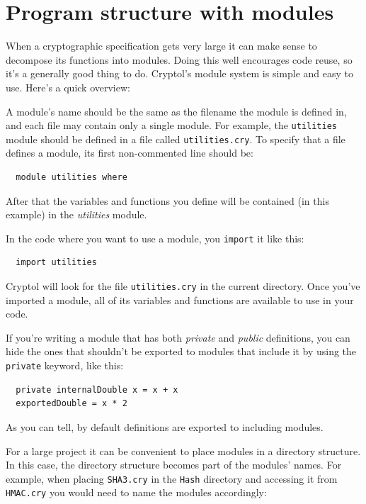 \section{Program structure with modules}

When a cryptographic specification gets very large it can make sense
to decompose its functions into modules.\indModuleSystem\indImport
Doing this well encourages
code reuse, so it's a generally good thing to do. Cryptol's module
system is simple and easy to use. Here's a quick overview:

A module's name should be the same as the filename the module is defined in,
and each file may contain only a single module. For example, the
\verb+utilities+ module should be defined in a file called
\verb+utilities.cry+. To specify that a file defines a module, its first
non-commented line should be:

\begin{verbatim}
  module utilities where
\end{verbatim}

After that the variables and functions you define will be contained
(in this example) in the {\it utilities} module.

In the code where you want to use a module, you \verb+import+ it like this:
\begin{verbatim}
  import utilities
\end{verbatim}

Cryptol will look for the file \verb+utilities.cry+ in the current directory. Once you've imported a module, all of its variables and functions are available to use in your code.

If you're writing a module that has both {\it private} and {\it public}
definitions, you can hide the ones that shouldn't be exported to modules
that include it by using the \verb+private+ keyword, like this:\indPrivate

\begin{verbatim}
  private internalDouble x = x + x
  exportedDouble = x * 2
\end{verbatim}

As you can tell, by default definitions are exported to including modules.

For a large project it can be convenient to place modules in a directory
structure.  In this case, the directory structure becomes part of the modules'
names.  For example, when placing \verb+SHA3.cry+ in the \verb+Hash+ directory and
accessing it from \verb+HMAC.cry+ you would need to name the modules
accordingly:

